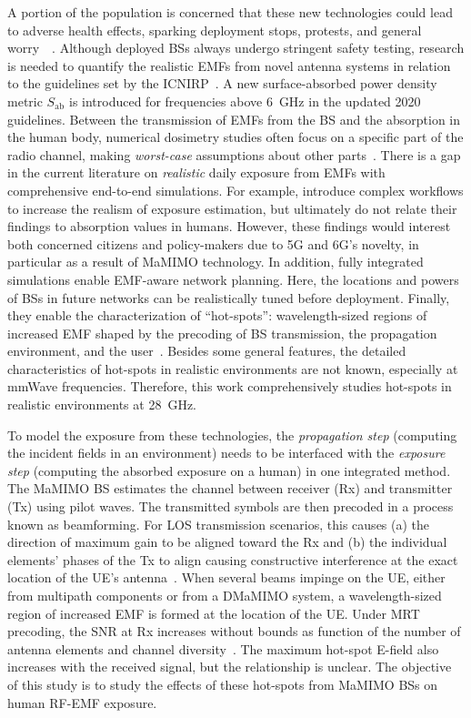 \documentclass{IEEEtran}
\begin{document}
A portion of the population is concerned that these new technologies could lead to adverse health effects, sparking deployment stops, protests, and general worry~\cite{worry5G}~\cite{worry5G2}. Although deployed \glspl{BS} always undergo stringent safety testing, research is needed to quantify the realistic \glspl{EMF} from novel antenna systems in relation to the guidelines set by the \gls{ICNIRP}~\cite{ICNIRP}. A new surface-absorbed power density metric $S_\mathrm{ab}$ is introduced for frequencies above 6~GHz in the updated 2020 guidelines. Between the transmission of \glspl{EMF} from the \gls{BS} and the absorption in the human body, numerical dosimetry studies often focus on a specific part of the radio channel, making \textit{worst-case} assumptions about other parts~\cite{worstcase}. There is a gap in the current literature on \textit{realistic} daily exposure from \glspl{EMF} with comprehensive end-to-end simulations. For example, \cite{1, 2} introduce complex workflows to increase the realism of exposure estimation, but ultimately do not relate their findings to absorption values in humans. However, these findings would interest both concerned citizens and policy-makers due to \gls{5G} and \gls{6G}’s novelty, in particular as a result of \gls{MaMIMO} technology. In addition, fully integrated simulations enable \gls{EMF}-aware network planning. Here, the locations and powers of \glspl{BS} in future networks can be realistically tuned before deployment. Finally, they enable the characterization of ``hot-spots”: wavelength-sized regions of increased \gls{EMF} shaped by the precoding of \gls{BS} transmission, the propagation environment, and the user~\cite{hotspots_art, hotspots_eucap, hotspots_bioem}. Besides some general features, the detailed characteristics of hot-spots in realistic environments are not known, especially at \gls{mmWave} frequencies. Therefore, this work comprehensively studies hot-spots in realistic environments at 28~GHz.

To model the exposure from these technologies, the \textit{propagation step} (computing the incident fields in an environment) needs to be interfaced with the \textit{exposure step} (computing the absorbed exposure on a human) in one integrated method. 
The \gls{MaMIMO} \gls{BS} estimates the channel between receiver (Rx) and transmitter (Tx) using pilot waves. The transmitted symbols are then precoded in a process known as beamforming. For \gls{LOS} transmission scenarios, this causes (a) the direction of maximum gain to be aligned toward the Rx and (b) the individual elements' phases of the Tx to align causing constructive interference at the exact location of the \gls{UE}'s antenna~\cite{beamforming}. When several beams impinge on the \gls{UE}, either from multipath components or from a \gls{DMaMIMO} system, a wavelength-sized region of increased \gls{EMF} is formed at the location of the \gls{UE}. Under \gls{MRT} precoding, the \gls{SNR} at Rx increases without bounds as function of the number of antenna elements and channel diversity~\cite{MIMO}. The maximum hot-spot E-field also increases with the received signal, but the relationship is unclear. The objective of this study is to study the effects of these hot-spots from \gls{MaMIMO} \glspl{BS} on human \gls{RF-EMF} exposure.
\end{document}
